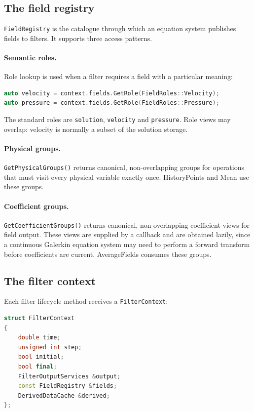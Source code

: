 \subsection{The field registry}

\texttt{FieldRegistry} is the catalogue through which an equation system
publishes fields to filters. It supports three access patterns.

\paragraph{Semantic roles.}
Role lookup is used when a filter requires a field with a particular meaning:

\begin{lstlisting}[language=C++]
auto velocity = context.fields.GetRole(FieldRoles::Velocity);
auto pressure = context.fields.GetRole(FieldRoles::Pressure);
\end{lstlisting}

The standard roles are \texttt{solution}, \texttt{velocity} and
\texttt{pressure}. Role views may overlap: velocity is normally a subset of the
solution storage.

\paragraph{Physical groups.}
\texttt{GetPhysicalGroups()} returns canonical, non-overlapping groups for
operations that must visit every physical variable exactly once. HistoryPoints
and Mean use these groups.

\paragraph{Coefficient groups.}
\texttt{GetCoefficientGroups()} returns canonical, non-overlapping coefficient
views for field output. These views are supplied by a callback and are obtained
lazily, since a continuous Galerkin equation system may need to perform a
forward transform before coefficients are current. AverageFields consumes
these groups.

\subsection{The filter context}

Each filter lifecycle method receives a \texttt{FilterContext}:

\begin{lstlisting}[language=C++]
struct FilterContext
{
    double time;
    unsigned int step;
    bool initial;
    bool final;
    FilterOutputServices &output;
    const FieldRegistry &fields;
    DerivedDataCache &derived;
};
\end{lstlisting}

